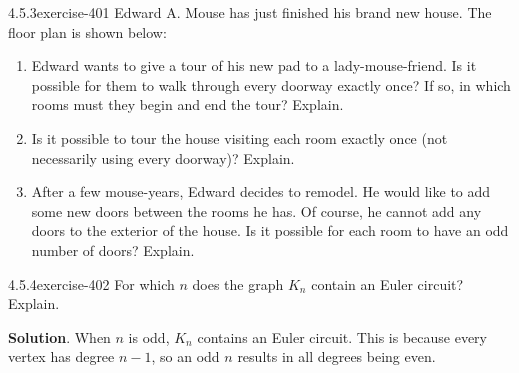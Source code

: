 \documentclass[twoside,11pt,]{book}
\numberwithin{equation}{chapter}
\begin{document}
\begin{divisionsolution}{4.5.3}{}{exercise-401}%
\hypertarget{p-4838}{}%
Edward A. Mouse has just finished his brand new house. The floor plan is shown below:%
\begin{sidebyside}{1}{0.26}{0.26}{0}%
\begin{sbspanel}{0.48}%
\end{sbspanel}%
\end{sidebyside}%
\par
\hypertarget{p-4839}{}%
\leavevmode%
\begin{enumerate}[label=(\alph*)]
\item\hypertarget{li-2328}{}\hypertarget{p-4840}{}%
Edward wants to give a tour of his new pad to a lady-mouse-friend. Is it possible for them to walk through every doorway exactly once? If so, in which rooms must they begin and end the tour? Explain. %
\item\hypertarget{li-2329}{}\hypertarget{p-4841}{}%
Is it possible to tour the house visiting each room exactly once (not necessarily using every doorway)? Explain. %
\item\hypertarget{li-2330}{}\hypertarget{p-4842}{}%
After a few mouse-years, Edward decides to remodel. He would like to add some new doors between the rooms he has. Of course, he cannot add any doors to the exterior of the house. Is it possible for each room to have an odd number of doors? Explain. %
\end{enumerate}
%
\end{divisionsolution}%
\begin{divisionsolution}{4.5.4}{}{exercise-402}%
\hypertarget{p-4843}{}%
For which \(n\) does the graph \(K_n\) contain an Euler circuit? Explain.%
\par\smallskip%
\noindent\textbf{Solution}.\quad%
\hypertarget{p-4844}{}%
When \(n\) is odd, \(K_n\) contains an Euler circuit. This is because every vertex has degree \(n-1\), so an odd \(n\) results in all degrees being even.%
\end{divisionsolution}%
\end{document}
